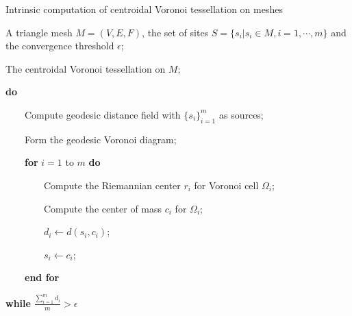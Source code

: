 \begin{algorithm} [t]
\label{alg:construction} \caption{Intrinsic computation of centroidal
Voronoi tessellation on meshes}
\begin{algorithmic}[1]
\Require A triangle mesh $M=(V,E,F)$, the set of sites
$S=\{s_i|s_i\in M, i=1,\cdots, m\}$ and the convergence threshold
$\epsilon$;

\Ensure The centroidal Voronoi tessellation on $M$;

\State \textbf{do}

\State ~~~~Compute geodesic distance field with $\{s_i\}_{i=1}^{m}$ as sources;

\State ~~~~Form the geodesic Voronoi diagram;

\State ~~~~\textbf{for} {$i=1$ to $m$} \textbf{do}

\State ~~~~~~~~Compute the Riemannian center $r_i$ for Voronoi cell $\Omega_i$;

\State ~~~~~~~~Compute the center of mass $c_i$ for $\Omega_i$;

\State ~~~~~~~~$d_i\gets d(s_i,c_i)$;

\State ~~~~~~~~$s_i\gets c_i$;

\State ~~~~\textbf{end for}

\State \textbf{while} $\frac{\sum_{i=1}^{m}d_i}{m}>\epsilon$

\end{algorithmic}
\end{algorithm}

